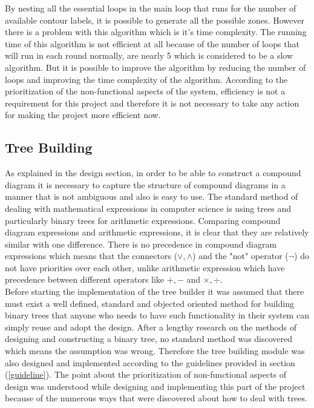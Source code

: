 \documentclass[10pt, a4paper, titlepage]{article}
\begin{document}
By nesting all the essential loops in the main loop that runs for the number of available contour labels, it is possible to generate all the possible zones. However there is a problem with this algorithm which is it's time complexity. The running time of this algorithm is not efficient at all because of the number of loops that will run in each round normally, are nearly 5 which is considered to be a slow algorithm. But it is possible to improve the algorithm by reducing the number of loops and improving the time complexity of the algorithm. According to the prioritization of the non-functional aspects of the system, efficiency is not a requirement for this project and therefore it is not necessary to take any action for making the project more efficient now.


\subsection{Tree Building}
As explained in the design section, in order to be able to construct a compound diagram it is necessary to capture the structure of compound diagrams in a manner that is not ambiguous and also is easy to use. The standard method of dealing with mathematical expressions in computer science is using trees and particularly binary trees for arithmetic expressions. Comparing compound diagram expressions and arithmetic expressions, it is clear that they are relatively similar with one difference. There is no precedence in compound diagram expressions which means that the connectors ($ \vee , \wedge $) and the "not" operator ($ \neg $) do not have priorities over each other, unlike arithmetic expression which have precedence between different operators like $ + , - $  and $ \times , \div $. \\

Before starting the implementation of the tree builder it was assumed that there must exist a well defined, standard and objected oriented method for building binary trees that anyone who needs to have such functionality in their system can simply reuse and adopt the design. After a lengthy research on the methods of designing and constructing a binary tree, no standard method was discovered which means the assumption was wrong. Therefore the tree building module was also designed and implemented according to the guidelines provided in section (\ref{guideline}). The point about the prioritization of non-functional aspects of design was understood while designing and implementing this part of the project because of the numerous ways that were discovered about how to deal with trees. \\
\end{document}
